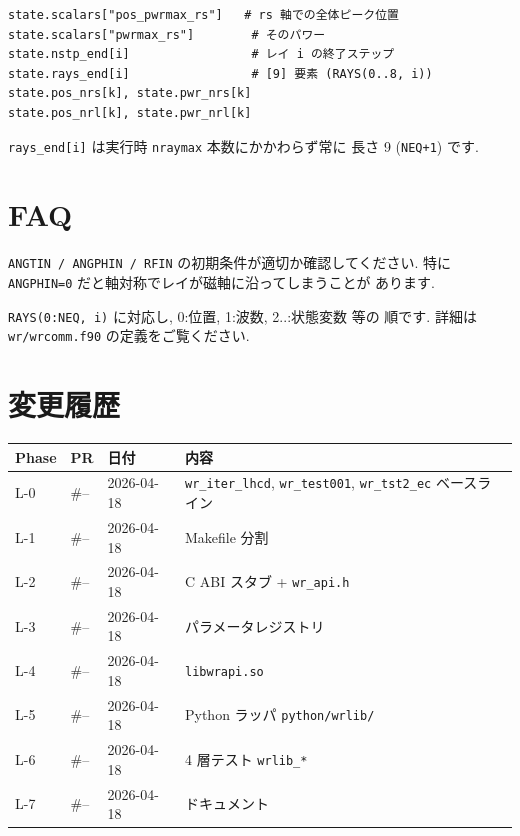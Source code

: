 \documentclass[11pt,a4paper]{report}
\begin{document}
\begin{lstlisting}[style=py]
state.scalars["pos_pwrmax_rs"]   # rs 軸での全体ピーク位置
state.scalars["pwrmax_rs"]        # そのパワー
state.nstp_end[i]                 # レイ i の終了ステップ
state.rays_end[i]                 # [9] 要素 (RAYS(0..8, i))
state.pos_nrs[k], state.pwr_nrs[k]
state.pos_nrl[k], state.pwr_nrl[k]
\end{lstlisting}

\texttt{rays\_end[i]} は実行時 \texttt{nraymax} 本数にかかわらず常に
長さ 9 (\texttt{NEQ+1}) です.

\section{FAQ}

\begin{faq}[Q. レイが全く動かない]
\texttt{ANGTIN / ANGPHIN / RFIN} の初期条件が適切か確認してください.
特に \texttt{ANGPHIN=0} だと軸対称でレイが磁軸に沿ってしまうことが
あります.
\end{faq}

\begin{faq}
\texttt{RAYS(0:NEQ, i)} に対応し, 0:位置, 1:波数, 2..:状態変数 等の
順です. 詳細は \texttt{wr/wrcomm.f90} の定義をご覧ください.
\end{faq}

\section{変更履歴}

\begin{center}
\begin{tabular}{@{}lllp{6.5cm}@{}}
\toprule
Phase & PR  & 日付 & 内容 \\ \midrule
L-0 & \#-- & 2026-04-18 & \texttt{wr\_iter\_lhcd}, \texttt{wr\_test001}, \texttt{wr\_tst2\_ec} ベースライン \\
L-1 & \#-- & 2026-04-18 & Makefile 分割 \\
L-2 & \#-- & 2026-04-18 & C ABI スタブ + \texttt{wr\_api.h} \\
L-3 & \#-- & 2026-04-18 & パラメータレジストリ \\
L-4 & \#-- & 2026-04-18 & \texttt{libwrapi.so} \\
L-5 & \#-- & 2026-04-18 & Python ラッパ \texttt{python/wrlib/} \\
L-6 & \#-- & 2026-04-18 & 4 層テスト \texttt{wrlib\_*} \\
L-7 & \#-- & 2026-04-18 & ドキュメント \\
\bottomrule
\end{tabular}
\end{center}
\end{document}
